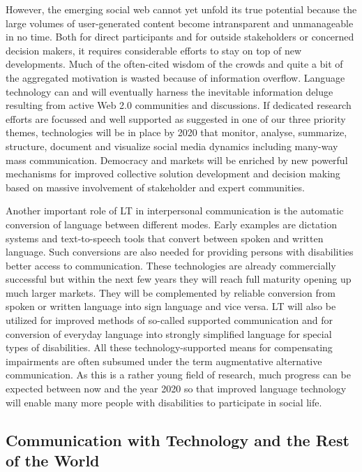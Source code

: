 \begin{multicols}{2}
However, the emerging social web cannot yet unfold its true potential because the large volumes of user-generated content become intransparent and unmanageable in no time. Both for direct participants and for outside stakeholders or concerned decision makers, it requires considerable efforts to stay on top of new developments. Much of the often-cited wisdom of the crowds and quite a bit of the aggregated motivation is wasted because of information overflow. Language technology can and will eventually harness the inevitable information deluge resulting from active Web 2.0 communities and discussions. If dedicated research efforts are focussed and well supported as suggested in one of our three priority themes, technologies will be in place by 2020 that monitor, analyse, summarize, structure, document and visualize social media dynamics including many-way mass communication. Democracy and markets will be enriched by new powerful mechanisms for improved collective solution development and decision making based on massive involvement of stakeholder and expert communities.
 
Another important role of LT in interpersonal communication is the automatic conversion of language between different modes. Early examples are dictation systems and text-to-speech tools that convert between spoken and written language. Such conversions are also needed for providing persons with disabilities better access to communication. These technologies are already commercially successful but within the next few years they will reach full maturity opening up much larger markets.  They will be complemented by reliable conversion from spoken or written language into sign language and vice versa. LT will also be utilized for improved methods of so-called supported communication and for conversion of everyday language into strongly simplified language for special types of disabilities. All these technology-supported means for compensating impairments are often subsumed under the term augmentative alternative communication. As this is a rather young field of research, much progress can be expected between now and the year 2020 so that improved language technology will enable many more people with disabilities to participate in social life.

\subsection{Communication with Technology and the Rest of the World}
\label{sec:comm-with-techn}


\end{multicols}

